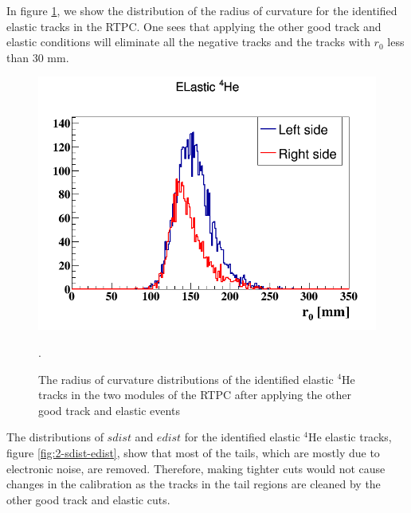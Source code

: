 In figure \ref{fig:2-r0}, we show the distribution of the radius of curvature 
for the identified elastic tracks in the RTPC. One sees that applying the other 
good track and elastic conditions will eliminate all the negative tracks and 
the tracks with $r_{0}$ less than 30 mm.
\begin{figure}[tp]
   \centering
\includegraphics[scale=0.34]{fig_rtpc/updates/r0_elastic_1p2GeV.png}
\caption{The radius of curvature distributions of the identified elastic 
$^{4}$He tracks in the two modules of the RTPC after applying the other good 
track and elastic events}.
\label{fig:2-r0}
\end{figure} 

The distributions of $sdist$ and $edist$ for the identified elastic $^4$He 
elastic tracks, figure \ref{fig:2-sdist-edist}, show that most of the tails, 
which are mostly due to electronic noise, are removed. Therefore, making 
tighter cuts would not cause changes in the calibration as the tracks in the 
tail regions are cleaned by the other good track and elastic cuts.

